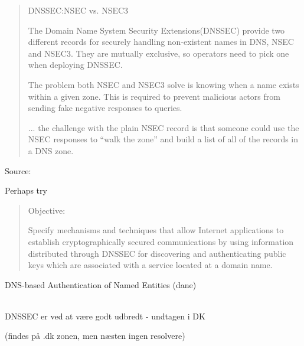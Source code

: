 \documentclass[20pt,landscape,a4paper,footrule]{foils}
\begin{document}

\begin{quote}
DNSSEC:NSEC vs. NSEC3

The Domain Name System Security Extensions(DNSSEC) provide two different records for securely handling non-existent names in DNS, NSEC and NSEC3. They are mutually exclusive, so operators need to pick one when deploying DNSSEC.

The problem both NSEC and NSEC3 solve is knowing when a name exists within a given zone. This is required to prevent malicious actors from sending fake negative responses to queries.

... the challenge with the plain NSEC record is that someone could use the NSEC responses to “walk the zone” and build a list of all of the records in a DNS zone.
\end{quote}

Source:\\
{\small{}}

Perhaps try 



\begin{quote}
Objective:

Specify mechanisms and techniques that allow Internet applications to
establish cryptographically secured communications by using information
distributed through DNSSEC for discovering and authenticating public
keys which are associated with a service located at a domain name.
\end{quote}

DNS-based Authentication of Named Entities (dane)\\
\\
{\footnotesize {}}

\vskip 2cm

\centerline{\Large DNSSEC er ved at være godt udbredt - undtagen i DK}
(findes på .dk zonen, men næsten ingen resolvere)




\end{document}
